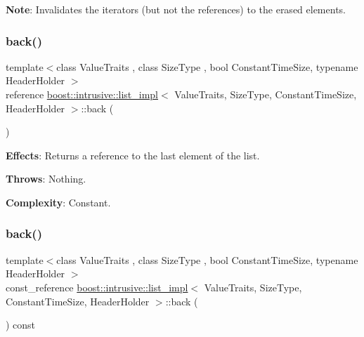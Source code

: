 {\bfseries Note}\+: Invalidates the iterators (but not the references) to the erased elements. \mbox{\label{classboost_1_1intrusive_1_1list__impl_a257758f8527be08329dbc14ca5527fd8}} 
\subsubsection{\texorpdfstring{back()}{back()}\hspace{0.1cm}{\footnotesize\ttfamily [1/2]}}
{\footnotesize\ttfamily template$<$class Value\+Traits , class Size\+Type , bool Constant\+Time\+Size, typename Header\+Holder $>$ \\
reference \hyperlink{classboost_1_1intrusive_1_1list__impl}{boost\+::intrusive\+::list\+\_\+impl}$<$ Value\+Traits, Size\+Type, Constant\+Time\+Size, Header\+Holder $>$\+::back (\begin{DoxyParamCaption}{ }\end{DoxyParamCaption})\hspace{0.3cm}{\ttfamily [inline]}}

{\bfseries Effects}\+: Returns a reference to the last element of the list.

{\bfseries Throws}\+: Nothing.

{\bfseries Complexity}\+: Constant. \mbox{\label{classboost_1_1intrusive_1_1list__impl_a92fa54fafbdf353a6b51c145c775d215}} 
\subsubsection{\texorpdfstring{back()}{back()}\hspace{0.1cm}{\footnotesize\ttfamily [2/2]}}
{\footnotesize\ttfamily template$<$class Value\+Traits , class Size\+Type , bool Constant\+Time\+Size, typename Header\+Holder $>$ \\
const\+\_\+reference \hyperlink{classboost_1_1intrusive_1_1list__impl}{boost\+::intrusive\+::list\+\_\+impl}$<$ Value\+Traits, Size\+Type, Constant\+Time\+Size, Header\+Holder $>$\+::back (\begin{DoxyParamCaption}{ }\end{DoxyParamCaption}) const\hspace{0.3cm}{\ttfamily [inline]}}

